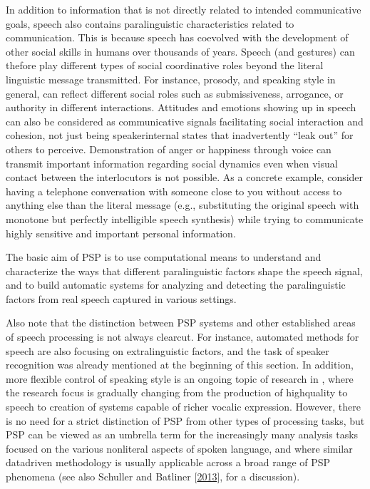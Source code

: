 \documentclass[letterpaper,10pt,english]{jupyterBook}
\begin{document}
\sphinxAtStartPar
In addition to information that is not directly related to intended
communicative goals, speech also contains paralinguistic characteristics
related to communication. This is because speech has co\sphinxhyphen{}evolved with the
development of other social skills in humans over thousands of years.
Speech (and gestures) can thefore play different types of social
coordinative roles beyond the literal linguistic message transmitted.
For instance, prosody, and speaking style in general, can reflect
different social roles such as submissiveness, arrogance, or authority
in different interactions. Attitudes and emotions showing up in speech
can also be considered as communicative signals facilitating social
interaction and cohesion, not just being speaker\sphinxhyphen{}internal states that
inadvertently “leak out” for others to perceive. Demonstration of anger
or happiness through voice can transmit important information regarding
social dynamics even when visual contact between the interlocutors is
not possible. As a concrete example, consider having a telephone
conversation with someone close to you without access to anything else
than the literal message (e.g., substituting the original speech with
monotone but perfectly intelligible speech synthesis) while trying to
communicate highly sensitive and important personal information.

\sphinxAtStartPar
The basic aim of PSP is to use computational means to understand and
characterize the ways that different paralinguistic factors shape the
speech signal, and to build automatic systems for analyzing and
detecting the paralinguistic factors from real speech captured in
various settings.

\sphinxAtStartPar
Also note that the distinction between PSP systems and other established
areas of speech processing is not always clear\sphinxhyphen{}cut. For instance,
automated methods for speech  are also focusing on
extralinguistic factors, and the task of speaker recognition was already
mentioned at the beginning of this section. In addition, more flexible
control of speaking style is an ongoing topic of research in , where the research focus is gradually
changing from the production of high\sphinxhyphen{}quality to speech to creation of
systems capable of richer vocalic expression. However, there is no need
for a strict distinction of PSP from other types of processing tasks,
but PSP can be viewed as an umbrella term for the increasingly many
analysis tasks focused on the various non\sphinxhyphen{}literal aspects of spoken
language, and where similar data\sphinxhyphen{}driven methodology is usually
applicable across a broad range of PSP phenomena (see also Schuller and Batliner {[}\hyperlink{cite.References:id8}{2013}{]}, for a discussion).
\end{document}
